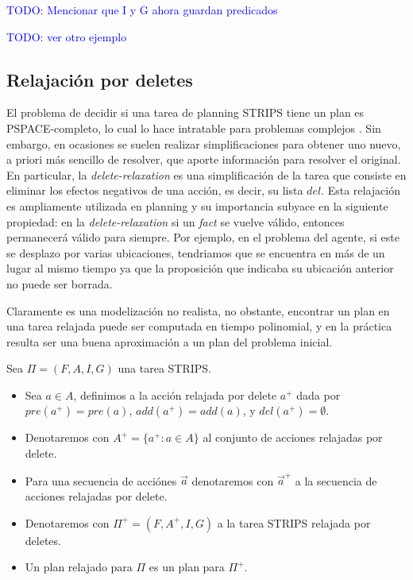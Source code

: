 \textcolor{blue}{TODO: Mencionar que I y G ahora guardan predicados}

\textcolor{blue}{TODO: ver otro ejemplo}

\subsection{Relajación por deletes}

El problema de decidir si una tarea de planning STRIPS tiene un plan es
PSPACE-completo, lo cual lo hace intratable para problemas complejos
\citep{Nau-Ghallab-Malik-Traverso-2004}. Sin embargo, en ocasiones se suelen
realizar simplificaciones para obtener uno nuevo, a priori más sencillo de
resolver, que aporte información para resolver el original. En particular, la
\emph{delete-relaxation} es una simplificación de la tarea que consiste en
eliminar los efectos negativos de una acción, es decir, su lista $del$. Esta
relajación es ampliamente utilizada en planning y su importancia subyace en la
siguiente propiedad: en la \emph{delete-relaxation} si un \emph{fact} se vuelve
válido, entonces permanecerá válido para siempre. Por ejemplo, en el problema del agente, si este se desplazo por
varias ubicaciones, tendriamos que se encuentra en más de un lugar al mismo
tiempo ya que la proposición que indicaba su ubicación anterior no puede ser
borrada.

Claramente es una modelización no realista, no obstante, encontrar un plan en una
tarea relajada puede ser computada en tiempo polinomial, y en la práctica
resulta ser una buena aproximación a un plan del problema inicial.

\begin{mydef}
    Sea $\Pi = (F, A, I, G)$ una tarea STRIPS.
    \begin{itemize}
        \item Sea $a \in A$, definimos a la acción relajada por delete $a^{+}$
        dada por $pre(a^{+}) = pre(a)$, $add(a^{+}) = add(a)$, y $del(a^{+}) =
        \emptyset$.

        \item Denotaremos con $A^{+} = \{a^{+} : a \in A\}$ al conjunto de
        acciones relajadas por delete.

        \item Para una secuencia de acciónes $\vec{a}$ denotaremos con
        $\vec{a}^{+}$ a la secuencia de acciones relajadas por delete.

        \item Denotaremos con $\Pi^{+} = (F, A^{+}, I, G)$ a la tarea STRIPS
        relajada por deletes.

        \item Un plan relajado para $\Pi$ es un plan para $\Pi^{+}$.
    \end{itemize}
\end{mydef}

